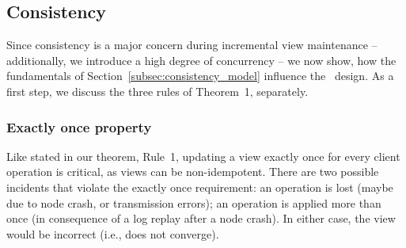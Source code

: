 %
%

\subsection{Consistency}
\label{sec:consistency}

Since consistency is a major concern during incremental view maintenance 
-- additionally, we introduce a high degree of concurrency -- we now 
show, how the fundamentals of Section~\ref{subsec:consistency_model} 
influence the \VMS\ design. As a first step, we discuss the three rules
of Theorem~1, separately.





\subsubsection{Exactly once property}
\label{subsubsec:exactly_once}  

Like stated in our theorem, Rule~1, updating a view exactly once for 
every client operation is critical, as views can be non-idempotent. 
There are two possible incidents that 
violate the exactly once requirement: an operation is lost (maybe due to 
node crash, or transmission errors); an operation is applied 
more than once (in consequence of a log replay after a node crash). 
In either case, the view would be incorrect (i.e., does not converge).

